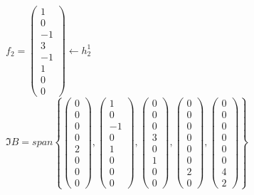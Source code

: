 \documentclass[a4paper, 10pt]{article}
\theoremstyle{theoremdd}
\begin{document}
$f_2 = \begin{pmatrix}
1 \\ 0 \\ -1 \\ 3 \\ -1 \\ 1 \\ 0 \\ 0
\end{pmatrix} \longleftarrow h_2^1$
\bigskip \\
$\Im B = span \left\{ \begin{pmatrix} 0 \\ 0 \\ 0 \\ 0 \\ 2 \\ 0 \\ 0 \\ 0 \end{pmatrix}, \begin{pmatrix} 1 \\ 0 \\ -1 \\ 0 \\ 1 \\ 0 \\ 0 \\ 0 \end{pmatrix}, \begin{pmatrix} 0 \\ 0 \\ 0 \\ 3 \\ 0 \\ 1 \\ 0 \\ 0 \end{pmatrix}, \begin{pmatrix} 0 \\ 0 \\ 0 \\ 0 \\ 0 \\ 0 \\ 2 \\ 0 \end{pmatrix}, \begin{pmatrix} 0 \\ 0 \\ 0 \\ 0 \\ 0 \\ 0 \\ 4 \\ 2 \end{pmatrix} \right\}$\\
\end{document}
